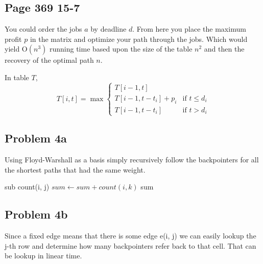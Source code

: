 \documentclass[12pt,twoside,letterpaper]{article}
\begin{document}
\subsection*{Page 369 15-7}
You could order the jobs $a$ by deadline $d$. From here you place the maximum profit $p$ in the matrix and optimize your path through the jobs. Which would yield $\textrm{O}(n^3)$ running time based upon the size of the table $n^2$ and then the recovery of the optimal path $n$.

In table $T$,
\[ T[i,t] = \max \left\{ \begin{array}{ll}
T[i-1,t]\\
T[i-1,t-t_i]+p_i & \mbox{if $t \le d_i$}\\
T[i-1,t-t_i] & \mbox{if $t > d_i$}\end{array} \right. \] 

\subsection*{Problem 4a}
Using Floyd-Warshall as a basis simply recursively follow the backpointers for all the shortest paths that had the same weight.

\begin{algorithmic}
\STATE sub count(i, j)
	\ELSE
		\STATE $sum \gets sum + count(i, k)$
		\ENDFOR
	\RETURN sum
	\ENDIF
\end{algorithmic}

\subsection*{Problem 4b}
Since a fixed edge means that there is some edge e(i, j) we can easily lookup the j-th row and determine how many backpointers refer back to that cell. That can be lookup in linear time.
\end{document}
